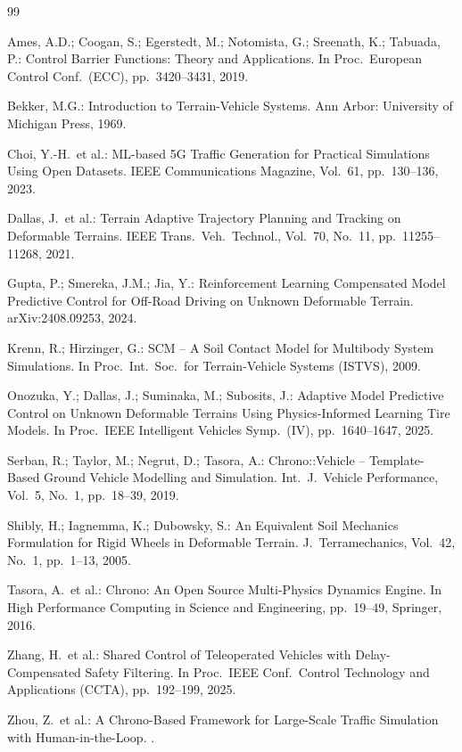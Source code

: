 \documentclass{acmd2026_fullpaper}
\begin{document}
\begin{thebibliography}{99}

  Ames, A.D.; Coogan, S.; Egerstedt, M.; Notomista, G.; Sreenath, K.; Tabuada, P.:
  Control Barrier Functions: Theory and Applications.
  \newblock In Proc.\ European Control Conf.\ (ECC), pp.~3420--3431, 2019.

  Bekker, M.G.: Introduction to Terrain-Vehicle Systems.
  \newblock Ann Arbor: University of Michigan Press, 1969.

  Choi, Y.-H.\ et al.: ML-based 5G Traffic Generation for Practical Simulations
  Using Open Datasets.
  \newblock IEEE Communications Magazine, Vol.~61, pp.~130--136, 2023.

  Dallas, J.\ et al.: Terrain Adaptive Trajectory Planning and Tracking on
  Deformable Terrains.
  \newblock IEEE Trans.\ Veh.\ Technol., Vol.~70, No.~11, pp.~11255--11268, 2021.

  Gupta, P.; Smereka, J.M.; Jia, Y.: Reinforcement Learning Compensated Model
  Predictive Control for Off-Road Driving on Unknown Deformable Terrain.
  \newblock arXiv:2408.09253, 2024.

  Krenn, R.; Hirzinger, G.: SCM -- A Soil Contact Model for Multibody System
  Simulations.
  \newblock In Proc.\ Int.\ Soc.\ for Terrain-Vehicle Systems (ISTVS), 2009.

  Onozuka, Y.; Dallas, J.; Suminaka, M.; Subosits, J.: Adaptive Model Predictive
  Control on Unknown Deformable Terrains Using Physics-Informed Learning Tire
  Models.
  \newblock In Proc.\ IEEE Intelligent Vehicles Symp.\ (IV), pp.~1640--1647, 2025.

  Serban, R.; Taylor, M.; Negrut, D.; Tasora, A.: Chrono::Vehicle -- Template-Based
  Ground Vehicle Modelling and Simulation.
  \newblock Int.\ J.\ Vehicle Performance, Vol.~5, No.~1, pp.~18--39, 2019.

  Shibly, H.; Iagnemma, K.; Dubowsky, S.: An Equivalent Soil Mechanics
  Formulation for Rigid Wheels in Deformable Terrain.
  \newblock J.\ Terramechanics, Vol.~42, No.~1, pp.~1--13, 2005.

  Tasora, A.\ et al.: Chrono: An Open Source Multi-Physics Dynamics Engine.
  \newblock In High Performance Computing in Science and Engineering,
  pp.~19--49, Springer, 2016.

  Zhang, H.\ et al.: Shared Control of Teleoperated Vehicles with
  Delay-Compensated Safety Filtering.
  \newblock In Proc.\ IEEE Conf.\ Control Technology and Applications (CCTA),
  pp.~192--199, 2025.

  Zhou, Z.\ et al.: A Chrono-Based Framework for Large-Scale Traffic Simulation
  with Human-in-the-Loop.
  .

\end{thebibliography}
\end{document}
